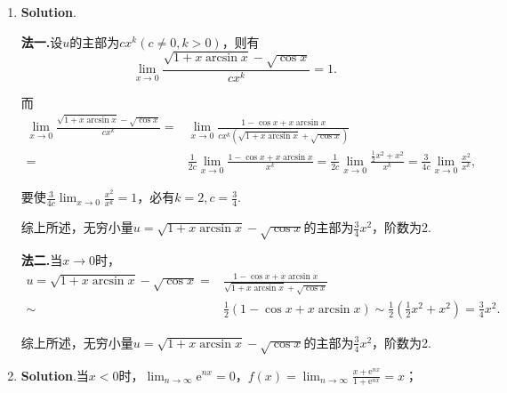 \documentclass[../Main.tex]{subfiles}
\begin{document}
\begin{enumerate}
          曲线在点$P$的切线斜率为$k=\left.\frac{\mathrm{d}y}{\mathrm{d}x}\right|_{t=1}
              =-1$，故切线方程为
          \[
              y-\frac{3}{2}=-\left(x-\frac{3}{2}\right)\quad\text{或}\quad x+y=3.
          \]

    \item \textbf{Solution}.

          \textbf{法一.}设$u$的主部为$cx^{k}(c\neq0,k>0)$，则有
          \[
              \lim_{x\to0}\frac{\sqrt{1+x\arcsin x}-\sqrt{\cos x}}{cx^{k}}=1.
          \]

          而
          \[
              \begin{aligned}
                  \lim_{x\to0}\frac{\sqrt{1+x\arcsin x}-\sqrt{\cos x}}{cx^k}= & \lim_{x\to0}\frac{1-\cos x+x\arcsin x}{cx^k(\sqrt{1+x\arcsin x}+\sqrt{\cos x})}                                                                           \\
                  =                                                           & \frac{1}{2c}\lim_{x\to0}\frac{1-\cos x+x\arcsin x}{x^k}=\frac{1}{2c}\lim_{x\to0}\frac{\frac{1}{2}x^2+x^2}{x^k}=\frac{3}{4c}\lim_{x\to0}{\frac{x^2}{x^k}},
              \end{aligned}
          \]

          要使$\frac{3}{4c}\lim_{x\to0}{\frac{x^{2}}{x^{k}}}=1$，必有$k=2,c=\frac{3}{4}$.

          综上所述，无穷小量$u=\sqrt{1+x\arcsin x}-\sqrt{\cos x}$的主部为$\frac{3}{4}
              x^{2}$，阶数为2.

          \textbf{法二.}当$x\to0$时，
          \[
              \begin{aligned}
                  u=\sqrt{1+x\arcsin x}-\sqrt{\cos x}= & \frac{1-\cos x+x\arcsin x}{\sqrt{1+x\arcsin x}+\sqrt{\cos x}}                                        \\
                  \sim                                 & \frac{1}{2}(1-\cos x+x\arcsin x)\sim\frac{1}{2}\left(\frac{1}{2}x^{2}+x^{2}\right)=\frac{3}{4}x^{2}.
              \end{aligned}
          \]

          综上所述，无穷小量$u=\sqrt{1+x\arcsin x}-\sqrt{\cos x}$的主部为$\frac{3}{4}
              x^{2}$，阶数为2.

    \item \textbf{Solution}.当$x<0$时，$\lim_{n\to\infty}\mathrm{e}^{nx}=0$，$f(x
              )=\lim_{n\to\infty}\frac{x+\mathrm{e}^{nx}}{1+\mathrm{e}^{nx}}=x$；


\end{enumerate}
\end{document}
